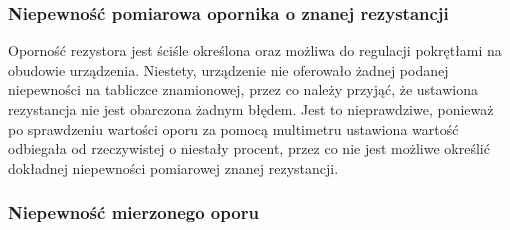 \documentclass[a4paper,12pts]{article}
\begin{document}
	
	\subsubsection{Niepewność pomiarowa opornika o znanej rezystancji}
	
	Oporność rezystora jest ściśle określona oraz możliwa do regulacji pokrętłami na obudowie urządzenia. Niestety, urządzenie nie oferowało żadnej podanej niepewności na tabliczce znamionowej, przez co należy przyjąć, że ustawiona rezystancja nie jest obarczona żadnym błędem. Jest to nieprawdziwe, ponieważ po sprawdzeniu wartości oporu za pomocą multimetru ustawiona wartość odbiegała od rzeczywistej o niestały procent, przez co nie jest możliwe określić dokładnej niepewności pomiarowej znanej rezystancji.
	
	
	\subsubsection{Niepewność mierzonego oporu}
	
\end{document}

